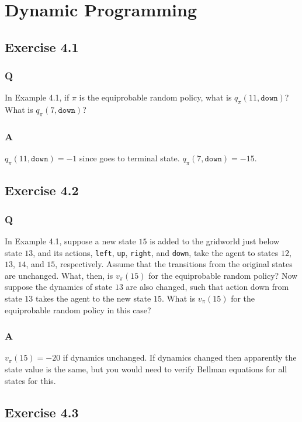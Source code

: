 \section{Dynamic Programming}

\subsection{Exercise 4.1}
\subsubsection{Q}
In Example 4.1, if $\pi$ is the equiprobable random policy, what is $q_\pi(11, \mathtt{down})$? What is $q_\pi(7, \mathtt{down})$?

\subsubsection{A}
$q_\pi(11, \mathtt{down}) = -1$ since goes to terminal state. $q_\pi(7, \mathtt{down}) = -15$.

\subsection{Exercise 4.2}
\subsubsection{Q}
In Example 4.1, suppose a new state $15$ is added to the gridworld just below state $13$, and its actions, \texttt{left}, \texttt{up}, \texttt{right}, and \texttt{down}, take the agent to states $12$, $13$, $14$, and $15$, respectively. Assume that the transitions from the original states are unchanged. What, then, is $v_\pi(15)$ for the equiprobable random policy? Now suppose the dynamics of state $13$ are also changed, such that action down from state $13$ takes the agent to the new state $15$. What is $v_\pi(15)$ for the equiprobable random policy in this case?

\subsubsection{A}
$v_\pi(15) = -20$ if dynamics unchanged. If dynamics changed then apparently the state value is the same, but you would need to verify Bellman equations for all states for this.

\subsection{Exercise 4.3}
